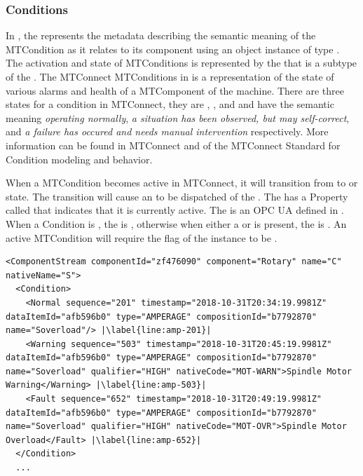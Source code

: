 \subsubsection{Conditions}\label{sec:mapping-conditions}
\lstset{language=XML,numbers=left,xleftmargin=2em}

In \cite{MTCPart2}, the  represents the metadata describing the semantic meaning of the \gls{MTCondition} as it relates to its component using an object instance of type . The activation and state of \glspl{MTCondition} is represented by the  that is a subtype of the . The MTConnect \glspl{MTCondition} in \cite{MTCPart3} is a representation of the state of various alarms and health of a \gls{MTComponent} of the machine. There are three states for a condition in MTConnect, they are , , and  and have the semantic meaning \textit{operating normally}, \textit{a situation has been observed, but may self-correct}, and \textit{a failure has occured and needs manual intervention} respectively. More information can be found in MTConnect \cite{MTCPart2} and \cite{MTCPart3} of the MTConnect Standard for Condition modeling and behavior.

When a \gls{MTCondition} becomes active in MTConnect, it will transition from  to  or  state. The transition will cause an  to be dispatched of the . The  has a \gls{Property} called  that indicates that it is currently active. The  is an OPC UA   defined in \cite{UAPart8}. When a Condition is , the  is , otherwise when either a  or  is present, the  is . An active \gls{MTCondition} will require the  flag of the  instance to be .

\begin{lstlisting}[firstnumber=last,escapechar=|,%
    caption={Rotary C Component Stream},label={lst:rotary-component-stream}]
<ComponentStream componentId="zf476090" component="Rotary" name="C" nativeName="S">
  <Condition>
    <Normal sequence="201" timestamp="2018-10-31T20:34:19.9981Z" dataItemId="afb596b0" type="AMPERAGE" compositionId="b7792870" name="Soverload"/> |\label{line:amp-201}|
    <Warning sequence="503" timestamp="2018-10-31T20:45:19.9981Z" dataItemId="afb596b0" type="AMPERAGE" compositionId="b7792870" name="Soverload" qualifier="HIGH" nativeCode="MOT-WARN">Spindle Motor Warning</Warning> |\label{line:amp-503}|
    <Fault sequence="652" timestamp="2018-10-31T20:49:19.9981Z" dataItemId="afb596b0" type="AMPERAGE" compositionId="b7792870" name="Soverload" qualifier="HIGH" nativeCode="MOT-OVR">Spindle Motor Overload</Fault> |\label{line:amp-652}|
  </Condition>
  ...
\end{lstlisting} %

